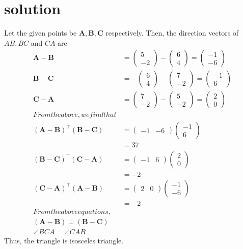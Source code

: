 \documentclass[10pt, a4paper]{article}
\providecommand{\brak}[1]{\ensuremath{\left(#1\right)}}
\newcommand{\myvec}[1]{\ensuremath{\begin{pmatrix}#1\end{pmatrix}}}
\let\vec\mathbf
\begin{document}
  \section{solution} Let the given points be $\vec{A}, \vec{B}, \vec{C}$ respectively. 
			 Then, the direction vectors of $AB, BC$ and $CA$ are
		\begin{align}
			\vec{A} -\vec{B}&= \myvec{5 \\ -2} -\myvec{6 \\ 4} = \myvec{-1 \\ -6}
			\\
			\vec{B} -\vec{C}&=  -\myvec{6 \\ 4}-\myvec{7 \\ -2} = \myvec{-1 \\ 6}
			\\
			\vec{C} -\vec{A}&= \myvec{7 \\ -2} -\myvec{5 \\ -2} = \myvec{2 \\ 0}
	\\
		From the above,  we find that 
		\\
			\brak{\vec{A} -\vec{B}}^{\top}\brak{\vec{B} -\vec{C}}&=  \myvec{-1 & -6}\myvec{-1 \\ 6}
			\\
			&=37
			\\
			\brak{\vec{B} -\vec{C}}^{\top}\brak{\vec{C} -\vec{A}}&=  \myvec{-1 & 6}\myvec{2 \\ 0}
\\
			&=-2
			\\
			\brak{\vec{C} -\vec{A}}^{\top}\brak{\vec{A} -\vec{B}}&=  \myvec{2 & 0}\myvec{-1 \\ -6}
\\
			&=-2
	\\
		From  the above equations, 
	\\
			\brak{\vec{A} -\vec{B}}\perp \brak{\vec{B} -\vec{C}}
			\\
			\angle BCA = \angle CAB  
	\end{align}
		Thus, the triangle is isosceles triangle.

   
\end{document}

